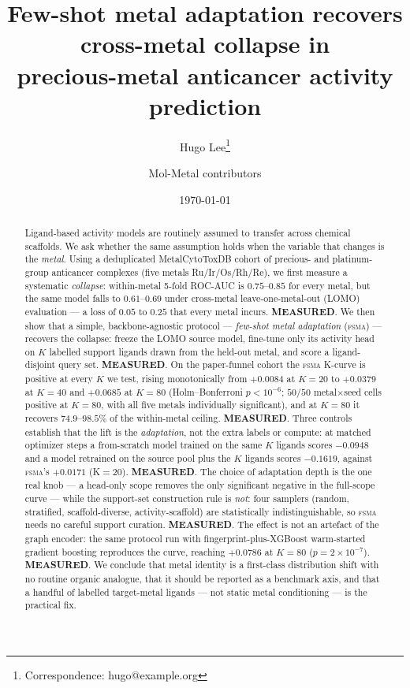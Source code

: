 \documentclass[11pt]{article}
\title{Few-shot metal adaptation recovers cross-metal collapse in\\
precious-metal anticancer activity prediction}
\author{Hugo Lee\thanks{Correspondence: hugo@example.org} \and Mol-Metal contributors}
\date{\today}
\newcommand{\fsma}{\textsc{fsma}}
\begin{document}
\maketitle

\begin{abstract}
Ligand-based activity models are routinely assumed to transfer across chemical
scaffolds. We ask whether the same assumption holds when the variable that
changes is the \emph{metal}. Using a deduplicated MetalCytoToxDB cohort of
precious- and platinum-group anticancer complexes (five metals
Ru/Ir/Os/Rh/Re), we first measure a systematic \emph{collapse}: within-metal
5-fold ROC-AUC is $0.75$--$0.85$ for every metal, but the same model
falls to $0.61$--$0.69$ under cross-metal leave-one-metal-out (LOMO) evaluation
--- a loss of $0.05$ to $0.25$ that every metal incurs.
\textbf{MEASURED}. We then show that a simple, backbone-agnostic protocol ---
\emph{few-shot metal adaptation} (\fsma) --- recovers the collapse: freeze the
LOMO source model, fine-tune only its activity head on $K$ labelled support
ligands drawn from the held-out metal, and score a ligand-disjoint query set.
\textbf{MEASURED}. On the paper-funnel cohort the \fsma{} K-curve is positive at
every $K$ we test, rising monotonically from $+0.0084$ at $K{=}20$ to
$+0.0379$ at $K{=}40$ and $+0.0685$ at $K{=}80$ (Holm--Bonferroni
$p<10^{-6}$; $50/50$ metal$\times$seed cells positive at $K{=}80$, with all
five metals individually significant), and at $K{=}80$ it recovers
$74.9$--$98.5\%$ of the within-metal ceiling. \textbf{MEASURED}. Three controls
establish that the lift is the \emph{adaptation}, not the extra labels or
compute: at matched optimizer steps a from-scratch model trained on the same
$K$ ligands scores $-0.0948$ and a model retrained on the source pool plus the
$K$ ligands scores $-0.1619$, against \fsma's $+0.0171$ (K$=20$). \textbf{MEASURED}.
The choice of adaptation depth is the one real knob --- a head-only scope
removes the only significant negative in the full-scope curve --- while the
support-set construction rule is \emph{not}: four samplers (random, stratified,
scaffold-diverse, activity-scaffold) are statistically indistinguishable, so
\fsma{} needs no careful support curation. \textbf{MEASURED}. The effect is not
an artefact of the graph encoder: the same protocol run with
fingerprint-plus-XGBoost warm-started gradient boosting reproduces the curve,
reaching $+0.0786$ at $K{=}80$ ($p=2\times10^{-7}$). \textbf{MEASURED}. We
conclude that metal identity is a first-class distribution shift with no routine
organic analogue, that it should be reported as a benchmark axis, and that a
handful of labelled target-metal ligands --- not static metal conditioning --- is
the practical fix.
\end{abstract}









\end{document}

